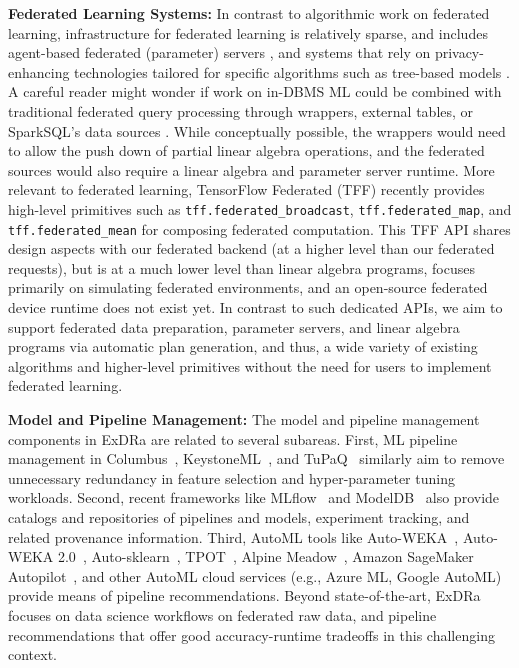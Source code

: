 \documentclass[sigconf,screen]{acmart}
\begin{document}
\textbf{Federated Learning Systems:} In contrast to algorithmic work on federated learning, infrastructure for federated learning is relatively sparse, and includes agent-based federated (parameter) servers \cite{BonawitzEGHIIKK19}, and systems that rely on privacy-enhancing technologies tailored for specific algorithms such as tree-based models \cite{WuCXCO20}. A careful reader might wonder if work on in-DBMS ML \cite{LuoGGPJ17,JankovLYCZJG19,DsilvaMK18} could be combined with traditional federated query processing \cite{JosifovskiSHL02} through wrappers, external tables, or SparkSQL's data sources \cite{ArmbrustXLHLBMK15}. While conceptually possible, the wrappers would need to allow the push down of partial linear algebra operations, and the federated sources would also require a linear algebra and parameter server runtime. More relevant to federated learning, TensorFlow Federated (TFF) \cite{tff,Smith20} recently provides high-level primitives such as \texttt{tff.federated\_broadcast}, \texttt{tff.federated\_map}, and \texttt{tff.federated\_mean} for composing federated computation. This TFF API shares design aspects with our federated backend (at a higher level than our federated requests), but is at a much lower level than linear algebra programs, focuses primarily on simulating federated environments, and an open-source federated device runtime does not exist yet. In contrast to such dedicated APIs, we aim to support federated data preparation, parameter servers, and linear algebra programs via automatic plan generation, and thus, a wide variety of existing algorithms and higher-level primitives without the need for users to implement federated learning. 

\textbf{Model and Pipeline Management:} The model and pipeline management components in ExDRa are related to several subareas. First, ML pipeline management in Columbus~\cite{ZhangKR14}, KeystoneML~\cite{SparksVKFR17}, and TuPaQ~\cite{SparksTHFJK15} similarly aim to remove unnecessary redundancy in feature selection and hyper-parameter tuning workloads. Second, recent frameworks like MLflow~\cite{ChenCDD0HKMMNOP20,ZahariaCD0HKMNO18} and ModelDB~\cite{VartakM18} also provide catalogs and repositories of pipelines and models, experiment tracking, and related provenance information. Third, AutoML tools like Auto-WEKA~\cite{ThorntonHHL13}, Auto-WEKA 2.0~\cite{KotthoffTHHL17}, Auto-sklearn~\cite{FeurerKES0H19}, TPOT~\cite{OlsonM19}, Alpine Meadow~\cite{ShangZBKECBUK19}, Amazon SageMaker Autopilot~\cite{DasIBRGKDRPSWZS20}, and other AutoML cloud services (e.g., Azure ML, Google AutoML) \cite{ZhangZWZ17} provide means of pipeline recommendations. Beyond state-of-the-art, ExDRa focuses on data science workflows on federated raw data, and pipeline recommendations that offer good accuracy-runtime tradeoffs in this challenging context.
\end{document}

